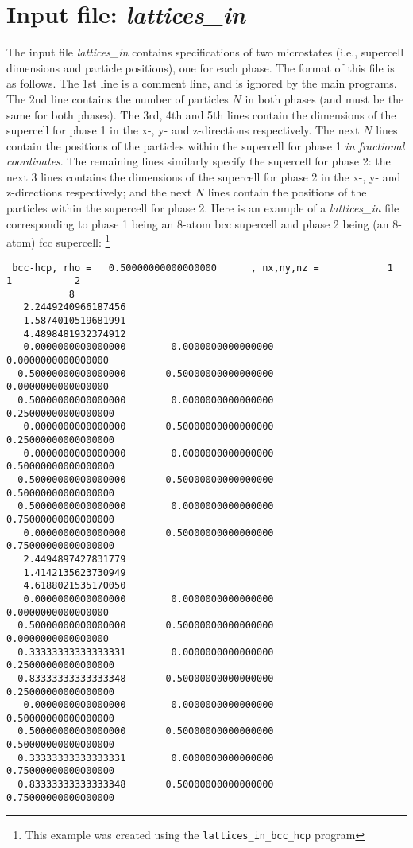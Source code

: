 \documentclass{report}
\begin{document}
\section{Input file: \emph{lattices\_in}}
The input file \emph{lattices\_in} contains specifications of two microstates (i.e., supercell dimensions and particle positions), one for
each phase. The format of this file is as follows. The 1st line is a comment line, and is ignored by the main programs. The 2nd line contains
the number of particles $N$ in both phases (and must be the same for both phases). The 3rd, 4th and 5th lines contain the dimensions of the
supercell for phase 1 in the x-, y- and z-directions respectively. The next $N$ lines contain the positions of the particles within the supercell
for phase 1 \emph{in fractional coordinates}. The remaining lines similarly specify the supercell for phase 2: the next 3 lines contains the 
dimensions of the supercell for phase 2 in the x-, y- and z-directions respectively; and the next $N$ lines contain the positions of the 
particles within the supercell for phase 2. Here is an example of a \emph{lattices\_in} file corresponding to phase 1 being an 8-atom bcc
supercell and phase 2 being (an 8-atom) fcc supercell:
\footnote{This example was created using the \texttt{lattices\_in\_bcc\_hcp} program}
\begin{verbatim}
 bcc-hcp, rho =   0.50000000000000000      , nx,ny,nz =            1           1           2
           8
   2.2449240966187456     
   1.5874010519681991     
   4.4898481932374912     
   0.0000000000000000        0.0000000000000000        0.0000000000000000     
  0.50000000000000000       0.50000000000000000        0.0000000000000000     
  0.50000000000000000        0.0000000000000000       0.25000000000000000     
   0.0000000000000000       0.50000000000000000       0.25000000000000000     
   0.0000000000000000        0.0000000000000000       0.50000000000000000     
  0.50000000000000000       0.50000000000000000       0.50000000000000000     
  0.50000000000000000        0.0000000000000000       0.75000000000000000     
   0.0000000000000000       0.50000000000000000       0.75000000000000000     
   2.4494897427831779     
   1.4142135623730949     
   4.6188021535170050     
   0.0000000000000000        0.0000000000000000        0.0000000000000000     
  0.50000000000000000       0.50000000000000000        0.0000000000000000     
  0.33333333333333331        0.0000000000000000       0.25000000000000000     
  0.83333333333333348       0.50000000000000000       0.25000000000000000     
   0.0000000000000000        0.0000000000000000       0.50000000000000000     
  0.50000000000000000       0.50000000000000000       0.50000000000000000     
  0.33333333333333331        0.0000000000000000       0.75000000000000000     
  0.83333333333333348       0.50000000000000000       0.75000000000000000     
\end{verbatim}
\end{document}
